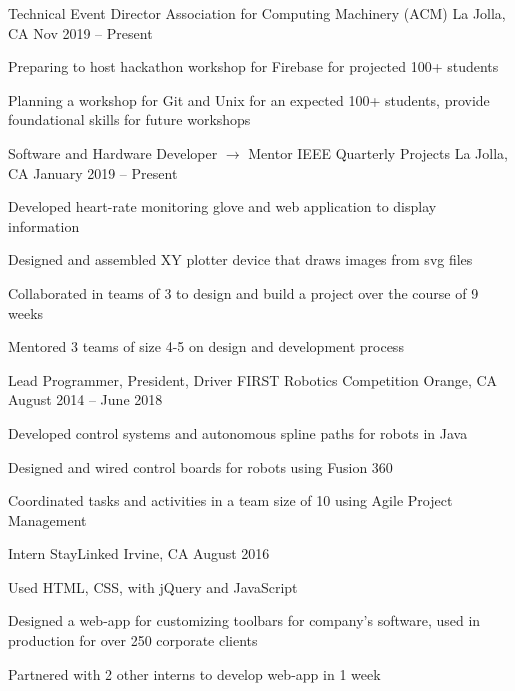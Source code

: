 \documentclass[]{awesome-cv}
\begin{document}
\vspace{-5mm}
\begin{cventries}
	\cventry
  {Technical Event Director}
  {Association for Computing Machinery (ACM)}
	{La Jolla, CA}
  {Nov 2019 – Present}
	{\begin{cvitems}
    \item {Preparing to host hackathon workshop for Firebase for
      projected 100+ students}
    \item {Planning a workshop for Git and Unix for an expected 100+ students,
      provide foundational skills for future workshops}
		\end{cvitems}}

	\vspace{-5mm}
	\cventry
  {Software and Hardware Developer $\longrightarrow$  Mentor}
	{IEEE Quarterly Projects}
	{La Jolla, CA}
  {January 2019 – Present}
	{\begin{cvitems}
		\item {Developed heart-rate monitoring glove and web application to display
      information}
    \item {Designed and assembled XY plotter device that draws images from svg
      files}
    \item {Collaborated in teams of 3 to design and build a project over the
      course of 9 weeks}
    \item {Mentored 3 teams of size 4-5 on design and development process}
		\end{cvitems}}

	\vspace{-5mm}
	\cventry
	{Lead Programmer, President, Driver}
	{FIRST Robotics Competition}
	{Orange, CA}
	{August 2014 – June 2018}
	{\begin{cvitems}
		\item {Developed control systems and autonomous spline paths for robots in
      Java}
		\item {Designed and wired control boards for robots using Fusion 360}
		\item {Coordinated tasks and activities in a team size of 10 using Agile
      Project Management}
		\end{cvitems}}

	\vspace{-5mm}
	\cventry
	{Intern}
	{StayLinked}
	{Irvine, CA}
	{August 2016}
	{\begin{cvitems}
		\item {Used HTML, CSS, with jQuery and JavaScript}
		\item {Designed a web-app for customizing toolbars for company’s software,
      used in production for over 250 corporate clients}
    \item {Partnered with 2 other interns to develop web-app in 1 week}
		\end{cvitems}}

\end{cventries}
\end{document}

